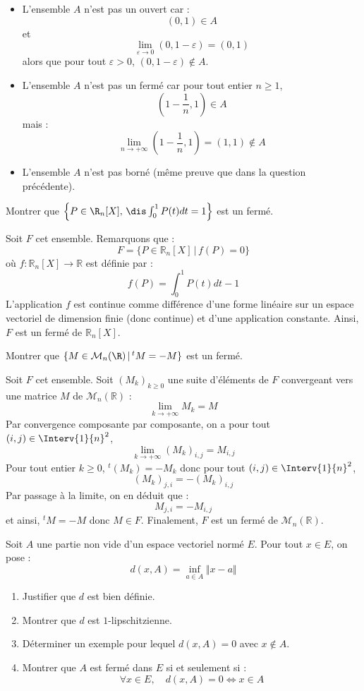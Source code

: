 \documentclass[a4paper,10pt]{report}
\begin{document}
\begin{enumerate}
\begin{itemize}
\item L'ensemble $A$ n'est pas un ouvert car :
$$ (0,1) \in A$$
et 
$$ \lim_{\varepsilon \rightarrow 0} (0,1- \varepsilon) = (0,1)$$
alors que pour tout $\varepsilon>0$, $(0,1- \varepsilon) \notin A$. 
\item L'ensemble $A$ n'est pas un fermé car  pour tout entier $n \geq 1$,
$$ \left(1- \dfrac{1}{n},1\right) \in A$$
mais :
$$ \lim_{n \rightarrow + \infty} \left(1- \dfrac{1}{n},1\right) = (1,1) \notin A$$
\item L'ensemble $A$ n'est pas borné (même preuve que dans la question précédente).
\end{itemize}
\end{enumerate}

\begin{Exercice}{} Montrer que $\left\{P\in\R_n[X], \, \dis\int_0^1P(t)dt= 1\right\}$ est un fermé.
\end{Exercice}

\corr Soit $F$ cet ensemble. Remarquons que :
$$ F = \lbrace P \in \mathbb{R}_n[X] \, \vert \, f(P)=0 \rbrace$$
où $f: \mathbb{R}_n[X] \rightarrow \mathbb{R}$ est définie par :
$$ f(P)= \int_0^1P(t)dt-1$$
L'application $f$ est continue comme différence d'une forme linéaire sur un espace vectoriel de dimension finie (donc continue) et d'une application constante. Ainsi, $F$ est un fermé de $\mathbb{R}_n[X]$.

\begin{Exercice}{} Montrer que $\{M\in{\cal M}_n(\R) \, \vert \,  ^tM=-M\}$ est un fermé.
\end{Exercice}

\corr Soit $F$ cet ensemble. Soit $(M_k)_{k \geq 0}$ une suite d'éléments de $F$ convergeant vers une matrice $M$ de $\mathcal{M}_n(\mathbb{R})$ :
$$ \lim_{k \rightarrow + \infty} M_k = M$$
Par convergence composante par composante, on a pour tout $(i,j) \in \Interv{1}{n}^2$,
$$  \lim_{k \rightarrow + \infty} (M_k)_{i,j} = M_{i,j}$$
Pour tout entier $k \geq 0$, $^t(M_k)=-M_k$ donc pour tout $(i,j) \in \Interv{1}{n}^2$,
$$ (M_k)_{j,i} = - (M_k)_{i,j}$$
Par passage à la limite, on en déduit que :
$$ M_{j,i}=-M_{i,j}$$
et ainsi, $^t M=-M$ donc $M \in F$. Finalement, $F$ est un fermé de $\mathcal{M}_n(\mathbb{R})$.

\begin{Exercice}{} Soit $A$ une partie non vide d'un espace vectoriel normé $E$. Pour tout $x \in E$, on pose :
$$d(x,A) = \inf_{a \in A} \Vert x- a \Vert$$

\begin{enumerate}
\item Justifier que $d$ est bien définie.
\item Montrer que $d$ est $1$-lipschitzienne.
\item Déterminer un exemple pour lequel $d(x,A)=0$ avec $x \notin A$.
\item Montrer que $A$ est fermé dans $E$ si et seulement si :
$$ \forall x \in E, \quad d(x,A)=0 \Longleftrightarrow x \in A $$
\end{enumerate}
\end{Exercice}
\end{document}
